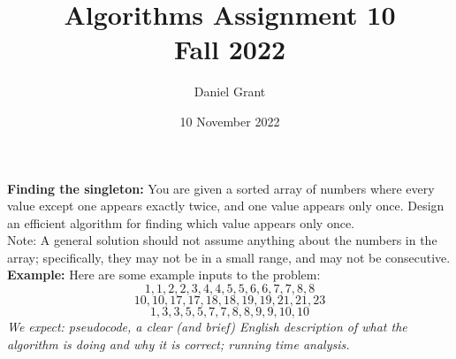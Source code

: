 \documentclass{report}
\title{\Huge{Algorithms Assignment 10}\\Fall 2022}
\author{\huge{Daniel Grant}}
\date{10 November 2022}
\begin{document}
\maketitle
\newpage%
\pagebreak


    \qs {} {
    \textbf{Finding the singleton:} You are given a sorted array of numbers where every value except one appears exactly twice, and one value appears only once. Design an efficient algorithm for finding which value appears only once. \\

Note: A general solution should not assume anything about the numbers in the array; specifically, they may not be in a small range, and may not be consecutive. \\

\textbf{Example:} Here are some example inputs to the problem:
$$
1,1,2,2,3,4,4,5,5,6,6,7,7,8,8
$$
$$
10,10,17,17,18,18,19,19,21,21,23
$$
$$
1,3,3,5,5,7,7,8,8,9,9,10,10
$$
\emph{We expect: pseudocode, a clear (and brief) English description of what the algorithm is doing and why it is correct; running time analysis.}
    }
\end{document}
